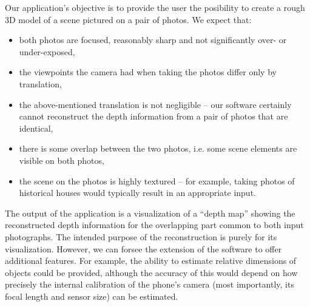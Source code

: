 Our application's objective is to provide the user the posibility to create a rough 3D model of a scene pictured on a pair of photos. 
We expect that: 

\begin{itemize}
\item both photos are focused, reasonably sharp and not significantly over- or under-exposed, 
\item the viewpoints the camera had when taking the photos differ only by translation, 
\item the above-mentioned translation is not negligible -- our software certainly cannot reconstruct the depth information from a pair of photos that are identical,
\item there is some overlap between the two photos, i.e. some scene elements are visible on both photos,
\item the scene on the photos is highly textured -- for example, taking photos of historical houses would typically result in an appropriate input.
\end{itemize}

The output of the application is a visualization of a ``depth map'' showing the reconstructed depth information for the overlapping part common to both input photographs. 
The intended purpose of the reconstruction is purely for its visualization. 
However, we can forsee the extension of the software to offer additional features. 
For example, the ability to estimate relative dimensions of objects could be provided, although the accuracy of this would depend on how precisely the internal calibration of the phone's camera (most importantly, its focal length and sensor size) can be estimated. %
















